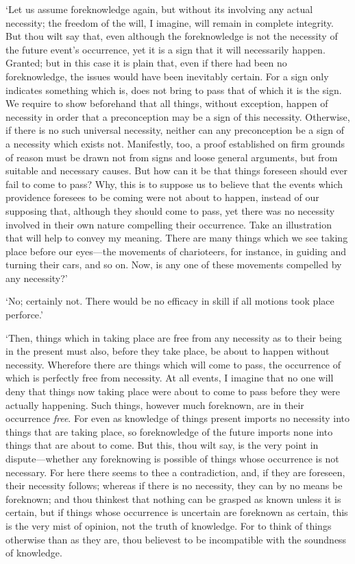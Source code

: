 \documentclass[11pt]{book}
\begin{document}
`Let us assume foreknowledge again, but without its involving any actual
necessity; the freedom of the will, I imagine, will remain in complete
integrity. But thou wilt say that, even although the foreknowledge is
not the necessity of the future event's occurrence, yet it is a sign
that it will necessarily happen. Granted; but in this case it is plain
that, even if there had been no foreknowledge, the issues would have
been inevitably certain. For a sign only indicates something which is,
does not bring to pass that of which it is the sign. We require to show
beforehand that all things, without exception, happen of necessity in
order that a preconception may be a sign of this necessity. Otherwise,
if there is no such universal necessity, neither can any preconception
be a sign of a necessity which exists not. Manifestly, too, a proof
established on firm grounds of reason must be drawn not from signs and
loose general arguments, but from suitable and necessary causes. But how
can it be that things foreseen should ever fail to come to pass? Why,
this is to suppose us to believe that the events which providence
foresees to be coming were not about to happen, instead of our supposing
that, although they should come to pass, yet there was no necessity
involved in their own nature compelling their occurrence. Take an
illustration that will help to convey my meaning. There are many things
which we see taking place before our eyes---the movements of charioteers,
for instance, in guiding and turning their cars, and so on. Now, is any
one of these movements compelled by any necessity?'

`No; certainly not. There would be no efficacy in skill if all motions
took place perforce.'

`Then, things which in taking place are free from any necessity as to
their being in the present must also, before they take place, be about
to happen without necessity. Wherefore there are things which will come
to pass, the occurrence of which is perfectly free from necessity. At
all events, I imagine that no one will deny that things now taking place
were about to come to pass before they were actually happening. Such
things, however much foreknown, are in their occurrence \emph{free}. For even
as knowledge of things present imports no necessity into things that are
taking place, so foreknowledge of the future imports none into things
that are about to come. But this, thou wilt say, is the very point in
dispute---whether any foreknowing is possible of things whose occurrence
is not necessary. For here there seems to thee a contradiction, and, if
they are foreseen, their necessity follows; whereas if there is no
necessity, they can by no means be foreknown; and thou thinkest that
nothing can be grasped as known unless it is certain, but if things
whose occurrence is uncertain are foreknown as certain, this is the very
mist of opinion, not the truth of knowledge. For to think of things
otherwise than as they are, thou believest to be incompatible with the \linebreak
soundness of knowledge.
\end{document}
